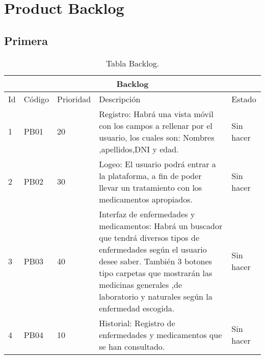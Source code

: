 \chapter{Product Backlog}

\section{Primera}

\begin{table}[htb]
	\centering
	\begin{tabular}{|l|p{2cm}|l|p{9cm}|l|}
		\hline
		\multicolumn{5}{|c|}{Backlog} \\ \hline
		Id & Código & Prioridad & Descripción & Estado \\
		\hline \hline
	
		1 & PB01 & 20 & Registro: Habrá una vista móvil con los campos a rellenar por el usuario, los cuales son: Nombres ,apellidos,DNI y edad. & Sin hacer \\ \hline
		2 & PB02 & 30 & Logeo: El usuario podrá entrar a la plataforma, a fin de poder llevar un tratamiento con los medicamentos apropiados. & Sin hacer \\ \hline
		
		3 & PB03 & 40 & Interfaz de enfermedades y medicamentos: Habrá un buscador que tendrá diversos tipos de enfermedades según el usuario desee saber. También 3 botones tipo carpetas que mostrarán las medicinas generales ,de laboratorio y naturales según la enfermedad escogida. & Sin hacer \\ \hline
		4 & PB04 & 10 & Historial: Registro de enfermedades y medicamentos que se han consultado. & Sin hacer \\ \hline
	\end{tabular}
	\caption{Tabla Backlog.}
	\label{tabla:Backlog}
\end{table}
